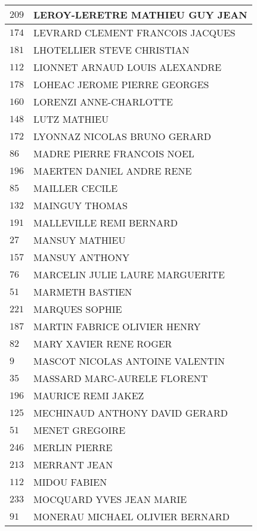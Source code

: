 \begin{xltabular}{\linewidth}{|l|X|}
    \hline
    $209$ & LEROY-LERETRE MATHIEU GUY JEAN \\
    \hline
    $174$ & LEVRARD CLEMENT FRANCOIS JACQUES \\
    \hline
    $181$ & LHOTELLIER STEVE CHRISTIAN \\
    \hline
    $112$ & LIONNET ARNAUD LOUIS ALEXANDRE \\
    \hline
    $178$ & LOHEAC JEROME PIERRE GEORGES \\
    \hline
    $160$ & LORENZI ANNE-CHARLOTTE \\
    \hline
    $148$ & LUTZ MATHIEU \\
    \hline
    $172$ & LYONNAZ NICOLAS BRUNO GERARD \\
    \hline
    $86$ & MADRE PIERRE FRANCOIS NOEL \\
    \hline
    $196$ & MAERTEN DANIEL ANDRE RENE \\
    \hline
    $85$ & MAILLER CECILE \\
    \hline
    $132$ & MAINGUY THOMAS \\
    \hline
    $191$ & MALLEVILLE REMI BERNARD \\
    \hline
    $27$ & MANSUY MATHIEU \\
    \hline
    $157$ & MANSUY ANTHONY \\
    \hline
    $76$ & MARCELIN JULIE LAURE MARGUERITE \\
    \hline
    $51$ & MARMETH BASTIEN \\
    \hline
    $221$ & MARQUES SOPHIE \\
    \hline
    $187$ & MARTIN FABRICE OLIVIER HENRY \\
    \hline
    $82$ & MARY XAVIER RENE ROGER \\
    \hline
    $9$ & MASCOT NICOLAS ANTOINE VALENTIN \\
    \hline
    $35$ & MASSARD MARC-AURELE FLORENT \\
    \hline
    $196$ & MAURICE REMI JAKEZ \\
    \hline
    $125$ & MECHINAUD ANTHONY DAVID GERARD \\
    \hline
    $51$ & MENET GREGOIRE \\
    \hline
    $246$ & MERLIN PIERRE \\
    \hline
    $213$ & MERRANT JEAN \\
    \hline
    $112$ & MIDOU FABIEN \\
    \hline
    $233$ & MOCQUARD YVES JEAN MARIE \\
    \hline
    $91$ & MONERAU MICHAEL OLIVIER BERNARD \\

\end{xltabular}
